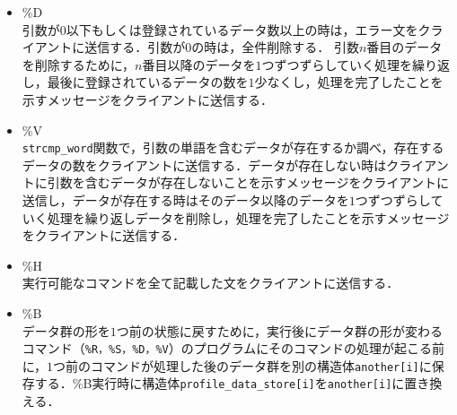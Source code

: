 \documentclass{jarticle}[11pt]
\begin{document}
\begin{itemize}
\item \%D \\
引数が$0$以下もしくは登録されているデータ数以上の時は，エラー文をクライアントに送信する．引数が$0$の時は，全件削除する．
引数$n$番目のデータを削除するために，$n$番目以降のデータを$1$つずつずらしていく処理を繰り返し，最後に登録されているデータの数を$1$少なくし，処理を完了したことを示すメッセージをクライアントに送信する．

\item \%V \\
\verb|strcmp_word|関数で，引数の単語を含むデータが存在するか調べ，存在するデータの数をクライアントに送信する．データが存在しない時はクライアントに引数を含むデータが存在しないことを示すメッセージをクライアントに送信し，データが存在する時はそのデータ以降のデータを$1$つずつずらしていく処理を繰り返しデータを削除し，処理を完了したことを示すメッセージをクライアントに送信する．

\item \%H \\
実行可能なコマンドを全て記載した文をクライアントに送信する．

\item \%B \\
データ群の形を$1$つ前の状態に戻すために，実行後にデータ群の形が変わるコマンド（\verb|%R，%S，%D，%V|）のプログラムにそのコマンドの処理が起こる前に，$1$つ前のコマンドが処理した後のデータ群を別の構造体\verb|another[i]|に保存する．\%B実行時に構造体\verb|profile_data_store[i]|を\verb|another[i]|に置き換える．
\end{itemize}


\end{document}
